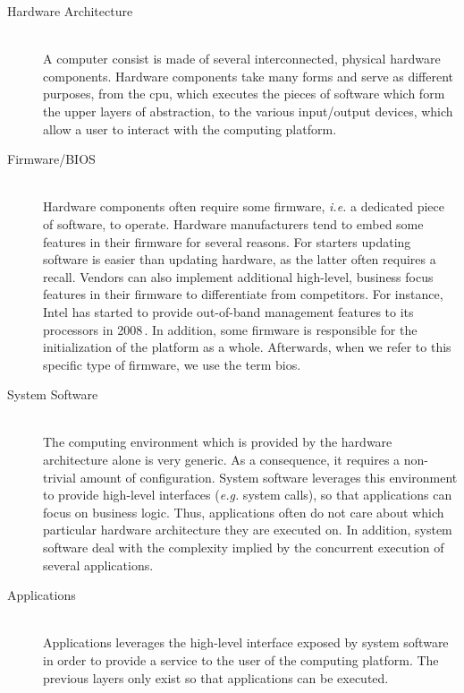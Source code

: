 \begin{description}
\item [Hardware Architecture] \hfill\\
  A computer consist is made of several inter\-connected, physical hardware
  components.
  Hardware components take many forms and serve as different purposes, from the
  \ac{cpu}, which executes the pieces of software which form the upper layers of
  abstraction, to the various input/output devices, which allow a user to
  interact with the computing platform.
\item [Firmware/BIOS] \hfill\\
  Hardware components often require some firm\-ware, \emph{i.e.} a dedicated
  piece of software, to operate.
  Hardware manufacturers tend to embed some features in their firmware for
  several reasons.
  For starters updating software is easier than updating hardware, as the latter
  often requires a recall.
  Vendors can also implement additional high-level, business focus features in
  their firmware to differentiate from competitors.
  For instance, Intel has started to provide out-of-band management features to
  its processors in 2008\,\cite{ruan2014me}.
  In addition, some firmware is responsible for the initialization of the
  platform as a whole.
  Afterwards, when we refer to this specific type of firmware, we use the term
  \ac{bios}.
\item [System Software] \hfill\\
  The computing environment which is provided by the hardware architecture alone
  is very generic.
  As a consequence, it requires a non-trivial amount of configuration.
  System software leverages this environment to provide high-level interfaces
  (\emph{e.g.} system calls), so that applications can focus on business
  logic. Thus, applications often do not care about which particular hardware
  architecture they are executed on.
  In addition, system software deal with the complexity implied by the
  concurrent execution of several applications.
\item [Applications] \hfill\\
  Applications leverages the high-level interface exposed by system software in
  order to provide a service to the user of the computing platform.
  The previous layers only exist so that applications can be executed.
\end{description}

